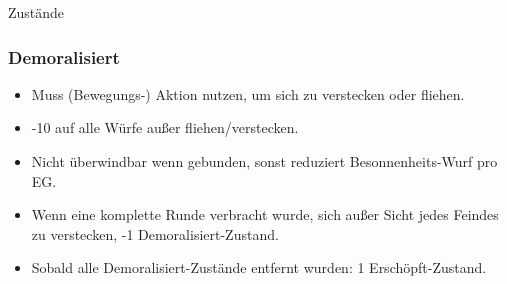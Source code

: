 \documentclass{article}
\begin{document}
\begin{multicols*}{3}
\begin{slsframe}{Zustände}
    \subsubsection*{Demoralisiert}
        \begin{itemize}%
            \item Muss (Bewegungs-) Aktion nutzen, um sich zu verstecken oder fliehen.
            \item -10 auf alle Würfe außer fliehen/verstecken.
            \item Nicht überwindbar wenn gebunden, sonst reduziert Besonnenheits-Wurf pro EG.
            \item Wenn eine komplette Runde verbracht wurde, sich außer Sicht jedes Feindes zu verstecken, -1 Demoralisiert-Zustand.
            \item Sobald alle Demoralisiert-Zustände entfernt wurden: 1 Erschöpft-Zustand.
        \end{itemize}   
\end{slsframe}
        

\end{multicols*}
\end{document}
